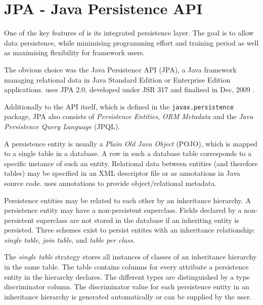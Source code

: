 \section{JPA - Java Persistence API}
\label{sec:jpa}
One of the key features of \salespoint{} is its integrated persistence layer. The goal is to allow data persistence, while minimising programming effort and training period as well as maximising flexibility for framework users.

The obvious choice was the Java Persistence API (JPA), a Java framework managing relational data in Java Standard Edition or Enterprise Edition applications. \salespoint{} uses JPA 2.0, developed under JSR 317 and finalised in Dec, 2009 \cite{jpa}.

Additionally to the API itself, which is defined in the \texttt{javax.persistence} package, JPA also consists of \textit{Persistence Entities}, \textit{ORM Metadata} and the \textit{Java Persistence Query Language} (JPQL).

A persistence entity is usually a \textit{Plain Old Java Object} (POJO), which is mapped to a single table in a database.
A row in such a database table corresponds to a specific instance of such an entity.
Relational data between entities (and therefore tables) may be specified in an XML descriptor file or as annotations in Java source code.
\salespoint{} uses annotations to provide object/relational metadata.

Persistence entities may be related to each other by an inheritance hierarchy.
A persistence entity may have a non-persistent superclass.
Fields declared by a non-persistent superclass are not stored in the database if an inheriting entity is persisted.
Three schemes exist to persist entites with an inheritance relationship: \textit{single table}, \textit{join table}, and \textit{table per class}.

The \textit{single table} strategy stores all instances of classes of an inheritance hierarchy in the same table.
The table contains columns for every attribute a persistence entity in the hierarchy declares.
The different types are distinguished by a type discriminator column.
The discriminator value for each persistence entity in an inheritance hierarchy is generated automatically or can be supplied by the user.

